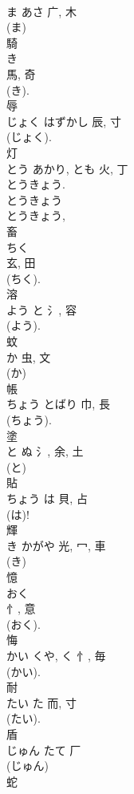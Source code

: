 \documentclass[8pt]{extreport}
\begin{document}
\begin{CJK}{UTF8}{min}
\\	ま	あさ	广, 木	
\\	(ま) 
\\	騎	
\\	き	
\\	馬, 奇	
\\	(き). 
\\	辱	
\\	じょく	はずかし	辰, 寸	
\\	(じょく). 
\\	灯	
\\	とう	あかり, とも	火, 丁	
\\	とうきょう. 
\\	とうきょう 
\\	とうきょう, 
\\	畜	
\\	ちく	
\\	玄, 田	
\\	(ちく). 
\\	溶	
\\	よう	と	氵, 容	
\\	(よう). 
\\	蚊	
\\	か	虫, 文	
\\	(か) 
\\	帳	
\\	ちょう	とばり	巾, 長	
\\	(ちょう).
\\	塗	
\\	と	ぬ	氵, 余, 土	
\\	(と) 
\\	貼	
\\	ちょう	は	貝, 占	
\\	(は)!
\\	輝	
\\	き	かがや	光, 冖, 車	
\\	(き) 
\\	憶	
\\	おく	
\\	忄, 意	
\\	(おく). 
\\	悔	
\\	かい	くや, く	忄, 毎	
\\	(かい). 
\\	耐	
\\	たい	た	而, 寸	
\\	(たい). 
\\	盾	
\\	じゅん	たて	厂		
\\	(じゅん) 
\\	蛇	

\end{CJK}
\end{document}
